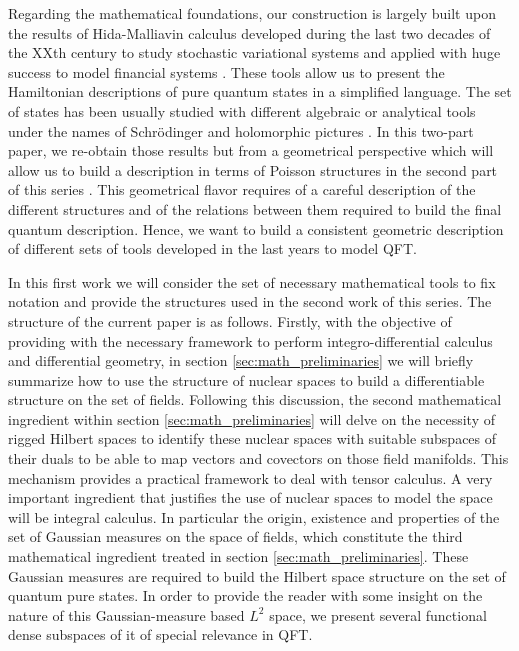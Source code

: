 \documentclass[12pt]{article}%
\begin{document}
Regarding the mathematical foundations, our construction is largely built upon the results of Hida-Malliavin calculus developed during the last two decades of the XXth century to study stochastic variational systems and applied with huge success to model financial systems \cite{Hida1980,Hida1993,Nunno2009, Wester2003}. These tools allow us to present the Hamiltonian descriptions of pure quantum states in a simplified language. The set of states has been usually studied with different algebraic or analytical tools under the names of  Schrödinger and holomorphic pictures \cite{Corichi2004,Oeckl2012,Oeckl2012a}.  In this two-part paper, we re-obtain those results but from a geometrical perspective which will allow us to build a description in terms of Poisson structures in the second part of this series  \cite{alonso2023a}.
  This geometrical flavor requires of a careful description of the different structures and of the relations between them required to build the final quantum description.  Hence, we want to build a consistent geometric description of  different sets of tools developed in the last years to model QFT. 

  In this first work we will consider the set of necessary mathematical tools to fix notation and provide the structures used in the second work of this series. The structure of the current paper is as follows. Firstly, with the objective of providing with the necessary framework to perform integro-differential calculus and differential geometry, in  section \ref{sec:math_preliminaries} we will briefly summarize how to use the structure of nuclear spaces  to build a differentiable structure on the set of fields. Following this discussion, the second mathematical ingredient within section \ref{sec:math_preliminaries} will delve on the necessity of rigged Hilbert spaces to identify these nuclear spaces with suitable subspaces of their duals to be able to map vectors and covectors on those field manifolds. This mechanism provides a practical framework to deal with tensor calculus.  A very important ingredient  that justifies the use of nuclear spaces to model the space will be  integral calculus. In particular the origin, existence and properties of the set of Gaussian measures on the space of fields, which constitute the third mathematical ingredient treated in section \ref{sec:math_preliminaries}. These Gaussian measures are required to build the Hilbert space structure on the set of quantum pure states.  In order to provide the reader with some insight on the nature of this Gaussian-measure based $L^2$ space, we present several functional dense subspaces of it of special relevance in QFT. 
 
\end{document}
